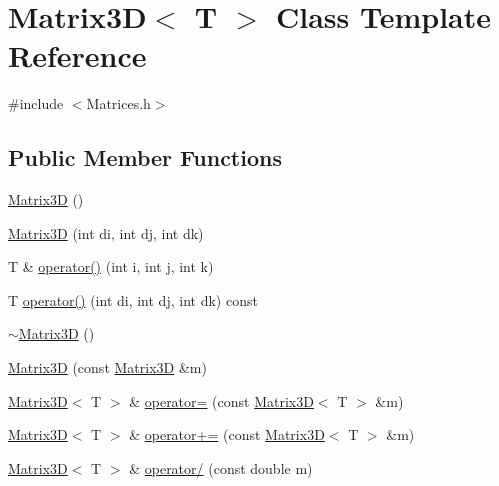 \hypertarget{classMatrix3D}{}\section{Matrix3D$<$ T $>$ Class Template Reference}
\label{classMatrix3D}


{\ttfamily \#include $<$Matrices.\+h$>$}

\subsection*{Public Member Functions}
\begin{DoxyCompactItemize}
\item 
\mbox{\hyperlink{classMatrix3D_a1589c062f12fbbb1f3681f90c20c4b78_a1589c062f12fbbb1f3681f90c20c4b78}{Matrix3D}} ()
\item 
\mbox{\hyperlink{classMatrix3D_a6c98f06b6f87c600bd9b00f6b253b37e_a6c98f06b6f87c600bd9b00f6b253b37e}{Matrix3D}} (int di, int dj, int dk)
\item 
T \& \mbox{\hyperlink{classMatrix3D_a56e772adacd4ccf54388e6c90e3d1269_a56e772adacd4ccf54388e6c90e3d1269}{operator()}} (int i, int j, int k)
\item 
T \mbox{\hyperlink{classMatrix3D_a600c100c8204bbc8f2e4ebefa55cab82_a600c100c8204bbc8f2e4ebefa55cab82}{operator()}} (int di, int dj, int dk) const
\item 
\mbox{\hyperlink{classMatrix3D_a7fda610223910a2b4dcfea445d2eb6c7_a7fda610223910a2b4dcfea445d2eb6c7}{$\sim$\+Matrix3D}} ()
\item 
\mbox{\hyperlink{classMatrix3D_ae3fc93ef3456a36c92f8cbb7db01c3a9_ae3fc93ef3456a36c92f8cbb7db01c3a9}{Matrix3D}} (const \mbox{\hyperlink{classMatrix3D}{Matrix3D}} \&m)
\item 
\mbox{\hyperlink{classMatrix3D}{Matrix3D}}$<$ T $>$ \& \mbox{\hyperlink{classMatrix3D_a0e84724f089ae3478283ea81d0b866af_a0e84724f089ae3478283ea81d0b866af}{operator=}} (const \mbox{\hyperlink{classMatrix3D}{Matrix3D}}$<$ T $>$ \&m)
\item 
\mbox{\hyperlink{classMatrix3D}{Matrix3D}}$<$ T $>$ \& \mbox{\hyperlink{classMatrix3D_a10b206ad9106931f7aa46a7b4d45c851_a10b206ad9106931f7aa46a7b4d45c851}{operator+=}} (const \mbox{\hyperlink{classMatrix3D}{Matrix3D}}$<$ T $>$ \&m)
\item 
\mbox{\hyperlink{classMatrix3D}{Matrix3D}}$<$ T $>$ \& \mbox{\hyperlink{classMatrix3D_ad45bff7f2159a4ba0aa4546635e8a73f_ad45bff7f2159a4ba0aa4546635e8a73f}{operator/}} (const double m)
\item 

\end{DoxyCompactItemize}
